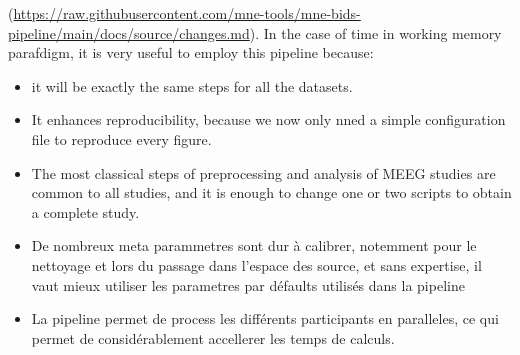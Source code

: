 (\url{https://raw.githubusercontent.com/mne-tools/mne-bids-pipeline/main/docs/source/changes.md}).
In the case of time in working memory parafdigm, it is very useful to employ this pipeline because:
\begin{itemize}
    \item it will be exactly the same steps for all the datasets.
    \item It enhances reproducibility, because we now only nned a simple configuration file to reproduce every figure.
    \item The most classical steps of preprocessing and analysis of MEEG studies are common to all studies, and it is enough to change one or two scripts to obtain a complete study.
    \item De nombreux meta parammetres sont dur à calibrer, notemment pour le nettoyage et lors du passage dans l'espace des source, et sans expertise, il vaut mieux utiliser les parametres par défaults utilisés dans la pipeline
    \item La pipeline permet de process les différents participants en paralleles, ce qui permet de considérablement accellerer les temps de calculs.
\end{itemize}
